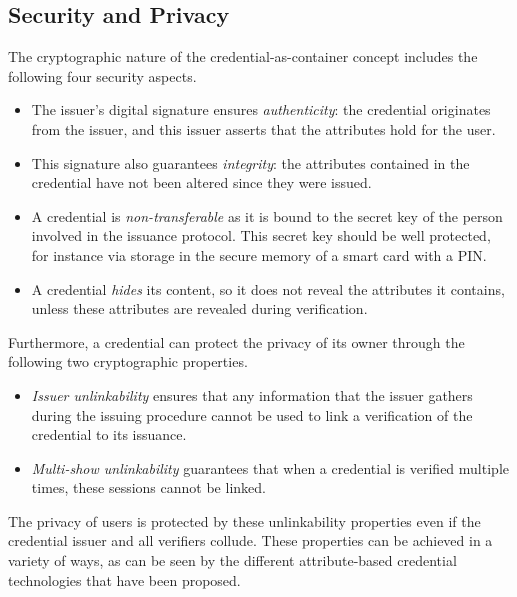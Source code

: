 \subsection{Security and Privacy}

The cryptographic nature of the credential-as-container concept includes the
following four security aspects.
\begin{itemize}
  \item The issuer's digital signature ensures \emph{authenticity}:
     the credential originates from the issuer, and this
    issuer asserts that the attributes hold for the user.
  \item This signature also guarantees \emph{integrity}:  the
    attributes contained in the credential have not been altered since they were
    issued.
  \item A credential is \emph{non-transferable} as
    it is bound to the secret key of the person involved in the issuance
    protocol. This secret key should be well protected, for instance via storage
    in the secure memory of a smart card with a PIN.
  \item A credential \emph{hides} its content, so it does not
    reveal the attributes it contains, unless these attributes are revealed
    during verification.
\end{itemize}
Furthermore, a credential can protect the privacy of its owner
through the following two cryptographic properties.
\begin{itemize}
  \item \emph{Issuer unlinkability}
     ensures that any
    information that the issuer gathers during the issuing procedure cannot be 
    used to link a verification of the credential to its issuance.
  \item \emph{Multi-show unlinkability}
     guarantees
    that when a credential is verified multiple times, these sessions cannot be
    linked.
\end{itemize}
The privacy of users is protected by these unlinkability properties even if the
credential issuer and all verifiers collude. These properties can
be achieved in a variety of ways, as can be seen by the different
attribute-based credential technologies that have been proposed.

